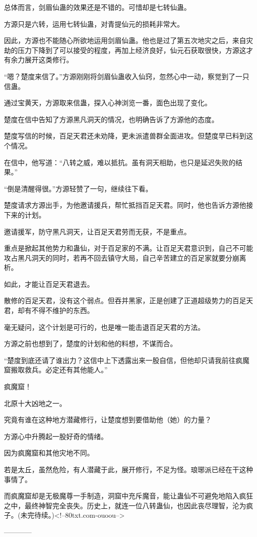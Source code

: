 \begin{this_body}
总体而言，剑眉仙蛊的效果还是不错的。可惜却是七转仙蛊。

方源只是六转，运用七转仙蛊，对青提仙元的损耗非常大。

因此，方源也不能随心所欲地运用剑眉仙蛊。他也是过了第五次地灾之后，来自灾劫的压力下降到了可以接受的程度，再加上经济良好，仙元石获取很快，方源这才有余力展开这类修行。

“嗯？楚度来信了。”方源刚刚将剑眉仙蛊收入仙窍，忽然心中一动，察觉到了一只信蛊。

通过宝黄天，方源取来信蛊，探入心神浏览一番，面色出现了变化。

楚度在信中告知了方源黑凡洞天的情况，也明确告诉了方源他的态度。

楚度写信的时候，百足天君还未劝降，更未派遣兽群全面进攻。但楚度早已料到这个情况。

在信中，他写道：“八转之威，难以抵抗。虽有洞天相助，也只是延迟失败的结果。”

“倒是清醒得很。”方源轻赞了一句，继续往下看。

楚度请求方源出手，为他邀请援兵，帮忙抵挡百足天君。同时，他也告诉方源他接下来的计划。

邀请援军，防守黑凡洞天，让百足天君劳而无获，不是重点。

重点是掀起其他势力和蛊仙，对于百足家的不满。让百足天君意识到，自己不可能攻占黑凡洞天的同时，若再不回去镇守大局，自己辛苦建立的百足家就要分崩离析。

如此，才能让百足天君退去。

散修的百足天君，没有这个弱点。但吞并黑家，正是创建了正道超级势力的百足天君，却有不得不维护的东西。

毫无疑问，这个计划是可行的，也是唯一能击退百足天君的方法。

方源之前也想到了，楚度的计划和他的料想，不谋而合。

“楚度到底还请了谁出力？这信中上下透露出来一股自信，但他却只请我前往疯魔窟搬取救兵。必定还有其他能人。”

疯魔窟！

北原十大凶地之一。

究竟有谁在这种地方潜藏修行，让楚度想到要借助他（她）的力量？

方源心中升腾起一股好奇的情绪。

因为疯魔窟和其他灾地不同。

若是太丘，虽然危险，有人潜藏于此，展开修行，不足为怪。琅琊派已经在干这种事情了。

而疯魔窟却是无极魔尊一手制造，洞窟中充斥魔音，能让蛊仙不可避免地陷入疯狂之中，最终神智完全丧失。历史上，就连一位八转蛊仙，也因此丧尽理智，沦为疯子。(未完待续。)<!--80txt.com-ouoou-->

------------

\end{this_body}

